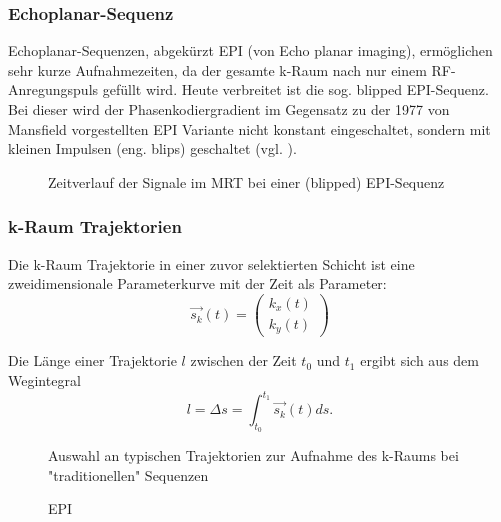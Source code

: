 \subsubsection{Echoplanar-Sequenz}
Echoplanar-Sequenzen, abgekürzt EPI (von Echo planar imaging), ermöglichen sehr kurze Aufnahmezeiten, da der gesamte k-Raum nach nur einem RF-Anregungspuls gefüllt wird. Heute verbreitet ist die sog. blipped EPI-Sequenz. Bei dieser wird der Phasenkodiergradient im Gegensatz zu der 1977 von Mansfield vorgestellten EPI Variante nicht konstant eingeschaltet, sondern mit kleinen Impulsen (eng. blips) geschaltet (vgl. \cite[S.~299]{Bushong2014}).

\begin{figure}[H]
	\centering
	\caption[Echoplanar Sequenz]{Zeitverlauf der Signale im MRT bei einer (blipped) EPI-Sequenz}
	\label{fig:EPIseq}
\end{figure}

\subsubsection{k-Raum Trajektorien}
Die k-Raum Trajektorie in einer zuvor selektierten Schicht ist eine zweidimensionale Parameterkurve mit der Zeit als Parameter:
\begin{equation}
	\vec{s_k}(t)=\begin{pmatrix}k_x(t) \\ k_y(t)\end{pmatrix}
\end{equation}

Die Länge einer Trajektorie $l$ zwischen der Zeit $t_0$ und $t_1$ ergibt sich aus dem Wegintegral
\begin{equation}
	l=\Delta s = \int_{t_0}^{t_1} \vec{s_k}(t) ds.
\end{equation}

\begin{figure}[H]
	\centering
	\hfill
	\hfill
	\caption{Auswahl an typischen Trajektorien zur Aufnahme des k-Raums bei "traditionellen" Sequenzen}
\end{figure}

\begin{figure}[H]
	\centering
	\caption[Echoplanar Sequenz]{EPI}
	\label{fig:EPI}
\end{figure}

